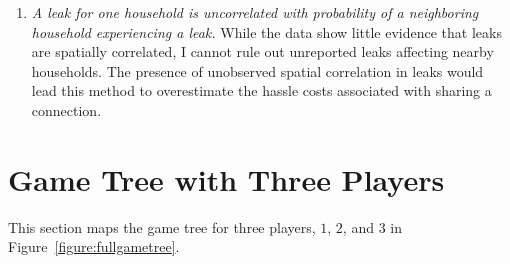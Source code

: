 \documentclass[12pt]{article}
\begin{document}
\begin{appendices}
\begin{enumerate}
	\item \textit{  A leak for one household is uncorrelated with probability of a neighboring household experiencing a leak. }  While the data show little evidence that leaks  are spatially correlated, I cannot rule out unreported leaks affecting nearby households.  The presence of unobserved spatial correlation in leaks would lead this method to overestimate the hassle costs associated with sharing a connection.
\end{enumerate}





\section{Game Tree with Three Players}\label{appendix:gametreefull}

This section maps the game tree for three players, $1$, $2$, and $3$ in Figure~\ref{figure:fullgametree}. 



\end{appendices}
\end{document}
